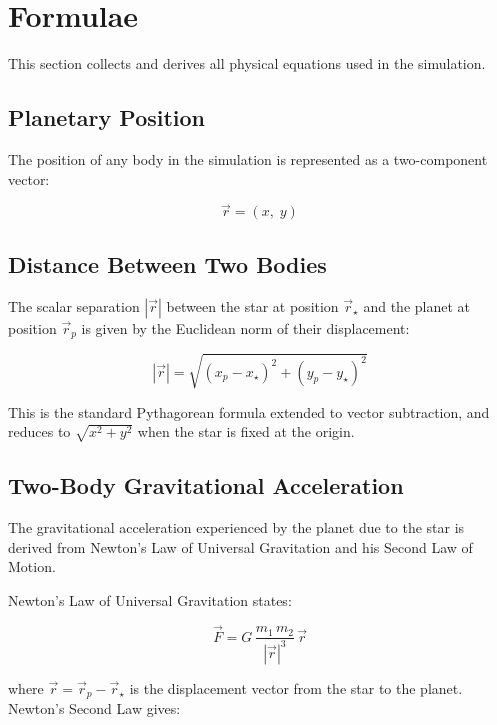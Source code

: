 \section{Formulae}

This section collects and derives all physical equations used in the simulation.

\subsection{Planetary Position}

The position of any body in the simulation is represented as a two-component vector:

\begin{equation}
\vec{r} = (x,\; y)
\end{equation}

\subsection{Distance Between Two Bodies}

The scalar separation $|\vec{r}|$ between the star at position $\vec{r}_\star$ and the planet at position $\vec{r}_p$ is given by the Euclidean norm of their displacement:

\begin{equation}
|\vec{r}| = \sqrt{(x_p - x_\star)^2 + (y_p - y_\star)^2}
\end{equation}

This is the standard Pythagorean formula extended to vector subtraction, and reduces to $\sqrt{x^2 + y^2}$ when the star is fixed at the origin.

\subsection{Two-Body Gravitational Acceleration}

The gravitational acceleration experienced by the planet due to the star is derived from Newton's Law of Universal Gravitation and his Second Law of Motion.

Newton's Law of Universal Gravitation states:

\begin{equation}
\vec{F} = G\,\frac{m_1\,m_2}{|\vec{r}|^3}\,\vec{r}
\end{equation}

where $\vec{r} = \vec{r}_p - \vec{r}_\star$ is the displacement vector from the star to the planet. Newton's Second Law gives:

